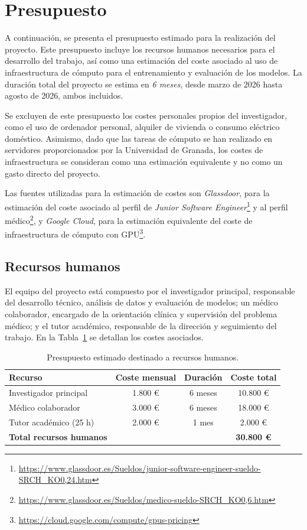 \section{Presupuesto}

A continuación, se presenta el presupuesto estimado para la realización del proyecto. Este presupuesto incluye los recursos humanos necesarios para el desarrollo del trabajo, así como una estimación del coste asociado al uso de infraestructura de cómputo para el entrenamiento y evaluación de los modelos. La duración total del proyecto se estima en \textit{6 meses}, desde marzo de 2026 hasta agosto de 2026, ambos incluidos.

Se excluyen de este presupuesto los costes personales propios del investigador, como el uso de ordenador personal, alquiler de vivienda o consumo eléctrico doméstico. Asimismo, dado que las tareas de cómputo se han realizado en servidores proporcionados por la Universidad de Granada, los costes de infraestructura se consideran como una estimación equivalente y no como un gasto directo del proyecto.

Las fuentes utilizadas para la estimación de costes son \textit{Glassdoor}, para la estimación del coste asociado al perfil de \textit{Junior Software Engineer}\footnote{\url{https://www.glassdoor.es/Sueldos/junior-software-engineer-sueldo-SRCH_KO0,24.htm}} y al perfil médico\footnote{\url{https://www.glassdoor.es/Sueldos/medico-sueldo-SRCH_KO0,6.htm}}, y \textit{Google Cloud}, para la estimación equivalente del coste de infraestructura de cómputo con GPU\footnote{\url{https://cloud.google.com/compute/gpus-pricing}}.
\subsection{Recursos humanos}

El equipo del proyecto está compuesto por el investigador principal, responsable del desarrollo técnico, análisis de datos y evaluación de modelos; un médico colaborador, encargado de la orientación clínica y supervisión del problema médico; y el tutor académico, responsable de la dirección y seguimiento del trabajo. En la Tabla~\ref{tab:recursos-humanos} se detallan los costes asociados.

\begin{table}[!htbp]
    \centering
    \begin{tabularx}{\textwidth}{|X|c|c|c|}
        \hline
        \textbf{Recurso} & \textbf{Coste mensual} & \textbf{Duración} & \textbf{Coste total} \\ \hline
        Investigador principal & 1.800 € & 6 meses & 10.800 € \\
        Médico colaborador & 3.000 € & 6 meses & 18.000 € \\
        Tutor académico (25 h) & 2.000 € & 1 mes & 2.000 € \\ \hline
        \textbf{Total recursos humanos} & & & \textbf{30.800 €} \\ \hline
    \end{tabularx}
    \caption{Presupuesto estimado destinado a recursos humanos.}
    \label{tab:recursos-humanos}
\end{table}

